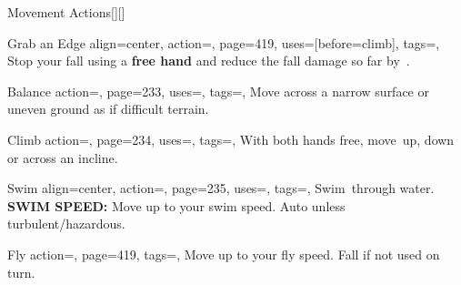 \begin{PageBackLandscape}
\begin{TablesHalf}{\backTableHeight}
\begin{Table}{Movement Actions}[][]
\begin{entry}{Grab an Edge}
{                align=center,
                action=,
                page=419,
                uses={[before=climb]},
                tags=\Manipulate,
            }
                Stop your fall using a \textbf{ free hand} and reduce the fall damage so far by 
                \,\Feet.\\\hfill
            \end{entry}
            \breakLine
            \begin{entry}{Balance}{%
                action=,
                page=233,
                uses=\Acrobatics,
                tags=\Move,
            }
                Move across a narrow surface or uneven ground as if difficult terrain.\hfill {}\quad {}
            \end{entry}
            \begin{entry}{Climb}{%
                action=,
                page=234,
                uses=\Athletics,
                tags=\Move,
            }
                With both hands free, move \,\Feet up, down or across an incline.\hfill {}
            \end{entry}
            \begin{entry}{Swim}{%
                align=center,
                action=,
                page=235,
                uses=\Athletics,
                tags=\Move,
            }
                Swim \,\Feet through water.  \hfill { \hfill {}\hfill }\\%
                 \hfill \textbf{SWIM SPEED:} Move up to your swim
                speed. Auto
                 unless turbulent/hazardous.
            \end{entry}
            \breakLine
            \begin{entry}{Fly}{%
                action=,
                page=419,
                tags=\Move,
            }
                Move up to your fly speed. Fall if not used on turn. \hfill

\end{entry}
\end{Table}
\end{TablesHalf}
\end{PageBackLandscape}
